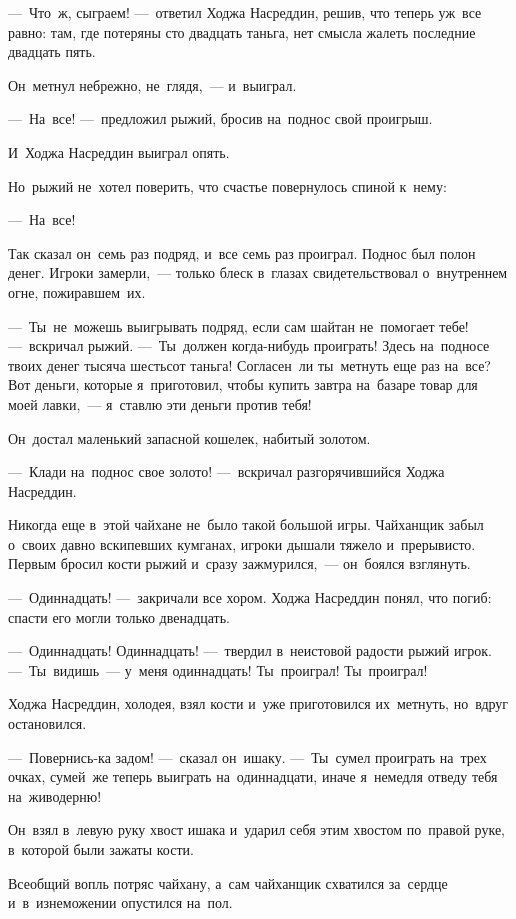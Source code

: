 \documentclass[12pt,a4paper]{book}
\begin{document}
—~Что~ж, сыграем! —~ответил Ходжа Насреддин, решив, что теперь уж~все равно: там, где потеряны сто двадцать таньга, нет смысла жалеть последние двадцать пять.

Он~метнул небрежно, не~глядя,~— и~выиграл.

—~На~все! —~предложил рыжий, бросив на~поднос свой проигрыш.

И~Ходжа Насреддин выиграл опять.

Но~рыжий не~хотел поверить, что счастье повернулось спиной к~нему:

—~На~все!

Так сказал он~семь раз подряд, и~все семь раз проиграл. Поднос был полон денег. Игроки замерли,~— только блеск в~глазах свидетельствовал о~внутреннем огне, пожиравшем~их.

—~Ты~не~можешь выигрывать подряд, если сам шайтан не~помогает тебе! —~вскричал рыжий. —~Ты~должен когда-нибудь проиграть! Здесь на~подносе твоих денег тысяча шестьсот таньга! Согласен~ли ты~метнуть еще раз на~все? Вот деньги, которые я~приготовил, чтобы купить завтра на~базаре товар для моей лавки,~— я~ставлю эти деньги против тебя!

Он~достал маленький запасной кошелек, набитый золотом.

—~Клади на~поднос свое золото! —~вскричал разгорячившийся Ходжа Насреддин.

Никогда еще в~этой чайхане не~было такой большой игры. Чайханщик забыл о~своих давно вскипевших кумганах, игроки дышали тяжело и~прерывисто. Первым бросил кости рыжий и~сразу зажмурился,~— он~боялся взглянуть.

—~Одиннадцать! —~закричали все хором. Ходжа Насреддин понял, что погиб: спасти его могли только двенадцать.

—~Одиннадцать! Одиннадцать! —~твердил в~неистовой радости рыжий игрок. —~Ты~видишь~— у~меня одиннадцать! Ты~проиграл! Ты~проиграл!

Ходжа Насреддин, холодея, взял кости и~уже приготовился их~метнуть, но~вдруг остановился.

—~Повернись-ка задом! —~сказал он~ишаку. —~Ты~сумел проиграть на~трех очках, сумей~же теперь выиграть на~одиннадцати, иначе я~немедля отведу тебя на~живодерню!

Он~взял в~левую руку хвост ишака и~ударил себя этим хвостом по~правой руке, в~которой были зажаты кости.

Всеобщий вопль потряс чайхану, а~сам чайханщик схватился за~сердце и~в~изнеможении опустился на~пол.
\end{document}
